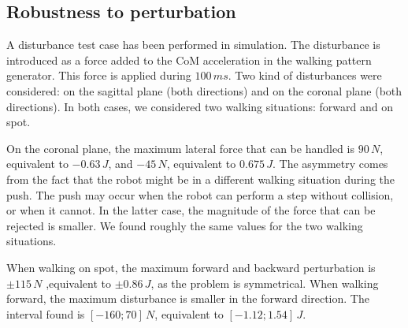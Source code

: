 \subsection{Robustness to perturbation}
%













A disturbance test case has been performed in simulation.
The disturbance is introduced as a force added to the CoM acceleration in the walking pattern generator.
This force is applied during $100\,ms$.
Two kind of disturbances were considered: on the sagittal plane (both directions) and on the coronal plane (both directions).
In both cases, we considered two walking situations: forward and on spot.

On the coronal plane, the maximum lateral force that can be handled is $90\,N$, equivalent to $-0.63\,J$, and $-45\,N$, equivalent to $0.675\,J$.
The asymmetry comes from the fact that the robot might be in a different walking situation during the push.
The push may occur when the robot can perform a step without collision, or when it cannot.
In the latter case, the magnitude of the force that can be rejected is smaller.
We found roughly the same values for the two walking situations.

When walking on spot, the maximum forward and backward perturbation is $\pm 115\,N$ ,equivalent to $\pm 0.86\,J$, as the problem  is symmetrical.
When walking forward, the maximum disturbance is smaller in the forward direction.
The interval found is $[-160;70]\,N$, equivalent to $[-1.12;1.54]\,J$.


